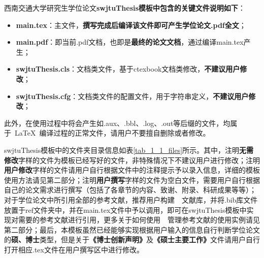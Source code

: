 西南交通大学研究生学位论文\textbf{swjtuThesis模板中包含的关键文件说明如下}：

\par
\begin{itemize}
  \item \textbf{main.tex}：主文件，\textbf{撰写完成后编译该文件即可产生学位论文.pdf全文}；
  \item \textbf{main.pdf}：即当前.pdf文档，也即是\textbf{最终的论文文档}，通过编译main.tex产生；
  \item \textbf{swjtuThesis.cls}：文档类文件，基于ctexbook文档类修改，\textbf{不建议用户修改}；
  \item \textbf{swjtuThesis.cfg}：文档类文件的配置文件，用于字符串定义，\textbf{不建议用户修改}；
\end{itemize}

\par
此外，在使用过程中将会产生如.aux、.bbl、.log、.out等后缀的文件，均属于~\LaTeX{}~编译过程的正常文件，请用户不要擅自删除或者修改。

\par
swjtuThesis模板中的文件夹目录信息如表\ref{tab_1_1_files}所示。其中，注明\textbf{无需修改}字样的文件为模板已经写好的文件，非特殊情况下不建议用户进行修改；注明\textbf{用户修改}字样的文件请用户自行根据文件中的注释提示予以录入信息，详细的模板使用方法请见第二部分；注明\textbf{用户撰写}字样的文件为空白文件，需要用户自行根据自己的论文需求进行撰写（包括了各章节的内容、致谢、附录、科研成果等等）；对于学位论文中所引用全部的参考文献，推荐用户构建~\BibTeX~文献库，并将.bib库文件放置于ref文件夹中，并在main.tex文件中予以调用，即可在swjtuThesis模板中实现对需要的参考文献进行引用，更多关于如何使用~\BibTeX~管理参考文献的使用实例请见第二部分；最后，本模板虽然已经能够实现根据用户输入的信息自行判断学位论文的\textbf{硕、博士}类型，但是关于\textbf{《博士创新声明》}及\textbf{《硕士主要工作》}文件请用户自行打开相应.tex文件在用户撰写区中进行修改。

